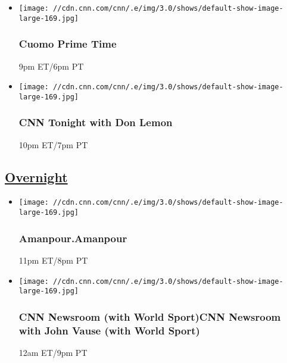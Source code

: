 \begin{itemize}
\item
  \texttt{[image: //cdn.cnn.com/cnn/.e/img/3.0/shows/default-show-image-large-169.jpg]}

  \hypertarget{cuomo-prime-time-1}{%
  \subsubsection{Cuomo Prime Time}\label{cuomo-prime-time-1}}

  9pm ET/6pm PT
\end{itemize}

\begin{itemize}
\item
  \texttt{[image: //cdn.cnn.com/cnn/.e/img/3.0/shows/default-show-image-large-169.jpg]}

  \hypertarget{cnn-tonight-with-don-lemon-1}{%
  \subsubsection{CNN Tonight with Don
  Lemon}\label{cnn-tonight-with-don-lemon-1}}

  10pm ET/7pm PT
\end{itemize}

\hypertarget{overnight--3}{%
\subsection{\texorpdfstring{\href{/tv/schedule/cnn/index.html}{Overnight}~}{Overnight~}}\label{overnight--3}}

\begin{itemize}
\item
  \texttt{[image: //cdn.cnn.com/cnn/.e/img/3.0/shows/default-show-image-large-169.jpg]}

  \hypertarget{amanpouramanpour--4}{%
  \subsubsection{Amanpour.Amanpour }\label{amanpouramanpour--4}}

  11pm ET/8pm PT
\end{itemize}

\begin{itemize}
\item
  \texttt{[image: //cdn.cnn.com/cnn/.e/img/3.0/shows/default-show-image-large-169.jpg]}

  \hypertarget{cnn-newsroom-with-world-sportcnn-newsroom-with-john-vause-with-world-sport--2}{%
  \subsubsection{CNN Newsroom (with World Sport)CNN Newsroom with John
  Vause (with World Sport)
  }\label{cnn-newsroom-with-world-sportcnn-newsroom-with-john-vause-with-world-sport--2}}

  12am ET/9pm PT
\end{itemize}

